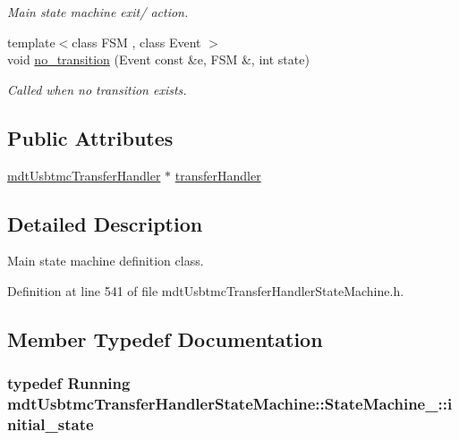 \begin{DoxyCompactItemize}
\begin{DoxyCompactList}\small\item\em Main state machine exit/ action. \end{DoxyCompactList}\item 
{\footnotesize template$<$class F\-S\-M , class Event $>$ }\\void \hyperlink{structmdt_usbtmc_transfer_handler_state_machine_1_1_state_machine___afc8fbf8fcbc2afc1c61743e1b8b40bb7}{no\-\_\-transition} (Event const \&e, F\-S\-M \&, int state)
\begin{DoxyCompactList}\small\item\em Called when no transition exists. \end{DoxyCompactList}\end{DoxyCompactItemize}
\subsection*{Public Attributes}
\begin{DoxyCompactItemize}
\item 
\hyperlink{classmdt_usbtmc_transfer_handler}{mdt\-Usbtmc\-Transfer\-Handler} $\ast$ \hyperlink{structmdt_usbtmc_transfer_handler_state_machine_1_1_state_machine___aa53bebaa070a0d20827225782efbcf1a}{transfer\-Handler}
\end{DoxyCompactItemize}


\subsection{Detailed Description}
Main state machine definition class. 

Definition at line 541 of file mdt\-Usbtmc\-Transfer\-Handler\-State\-Machine.\-h.



\subsection{Member Typedef Documentation}
\hypertarget{structmdt_usbtmc_transfer_handler_state_machine_1_1_state_machine___a23235494fc23e9a54350ae7acc19ce3d}{
\subsubsection[{initial\-\_\-state}]{\setlength{\rightskip}{0pt plus 5cm}typedef {\bf Running} {\bf mdt\-Usbtmc\-Transfer\-Handler\-State\-Machine\-::\-State\-Machine\-\_\-\-::initial\-\_\-state}}}\label{structmdt_usbtmc_transfer_handler_state_machine_1_1_state_machine___a23235494fc23e9a54350ae7acc19ce3d}


